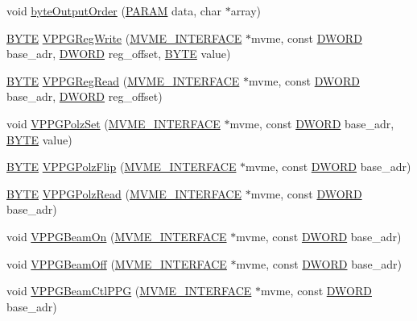 \begin{DoxyCompactItemize}
\item 
void \hyperlink{vppg_8h_a75ca53aa4c6983bef5186a0138854857}{byteOutputOrder} (\hyperlink{structparameters}{PARAM} data, char $\ast$array)
\item 
\hyperlink{vt2_8h_a4ae1dab0fb4b072a66584546209e7d58}{BYTE} \hyperlink{vppg_8h_a4f6ab8a9fcc14540cbd36f5d9313e8e8}{VPPGRegWrite} (\hyperlink{structMVME__INTERFACE}{MVME\_\-INTERFACE} $\ast$mvme, const \hyperlink{vt2_8h_a798af1e30bc65f319c1a246cecf59e39}{DWORD} base\_\-adr, \hyperlink{vt2_8h_a798af1e30bc65f319c1a246cecf59e39}{DWORD} reg\_\-offset, \hyperlink{vt2_8h_a4ae1dab0fb4b072a66584546209e7d58}{BYTE} value)
\item 
\hyperlink{vt2_8h_a4ae1dab0fb4b072a66584546209e7d58}{BYTE} \hyperlink{vppg_8h_ab31234aa03b2821e9b5fc3be5a62d2fb}{VPPGRegRead} (\hyperlink{structMVME__INTERFACE}{MVME\_\-INTERFACE} $\ast$mvme, const \hyperlink{vt2_8h_a798af1e30bc65f319c1a246cecf59e39}{DWORD} base\_\-adr, \hyperlink{vt2_8h_a798af1e30bc65f319c1a246cecf59e39}{DWORD} reg\_\-offset)
\item 
void \hyperlink{vppg_8h_aba92a718f41a4d59f7ee3493fc703c42}{VPPGPolzSet} (\hyperlink{structMVME__INTERFACE}{MVME\_\-INTERFACE} $\ast$mvme, const \hyperlink{vt2_8h_a798af1e30bc65f319c1a246cecf59e39}{DWORD} base\_\-adr, \hyperlink{vt2_8h_a4ae1dab0fb4b072a66584546209e7d58}{BYTE} value)
\item 
\hyperlink{vt2_8h_a4ae1dab0fb4b072a66584546209e7d58}{BYTE} \hyperlink{vppg_8h_ae7f3d0874c56189b93a9abde9c337714}{VPPGPolzFlip} (\hyperlink{structMVME__INTERFACE}{MVME\_\-INTERFACE} $\ast$mvme, const \hyperlink{vt2_8h_a798af1e30bc65f319c1a246cecf59e39}{DWORD} base\_\-adr)
\item 
\hyperlink{vt2_8h_a4ae1dab0fb4b072a66584546209e7d58}{BYTE} \hyperlink{vppg_8h_a5250200ded85e3f2e65c941384379ed5}{VPPGPolzRead} (\hyperlink{structMVME__INTERFACE}{MVME\_\-INTERFACE} $\ast$mvme, const \hyperlink{vt2_8h_a798af1e30bc65f319c1a246cecf59e39}{DWORD} base\_\-adr)
\item 
void \hyperlink{vppg_8h_acbbb2e3ab52f1662cfd8fba628ebf1ca}{VPPGBeamOn} (\hyperlink{structMVME__INTERFACE}{MVME\_\-INTERFACE} $\ast$mvme, const \hyperlink{vt2_8h_a798af1e30bc65f319c1a246cecf59e39}{DWORD} base\_\-adr)
\item 
void \hyperlink{vppg_8h_a2cdff7a4d21921939992eba5946ea4ad}{VPPGBeamOff} (\hyperlink{structMVME__INTERFACE}{MVME\_\-INTERFACE} $\ast$mvme, const \hyperlink{vt2_8h_a798af1e30bc65f319c1a246cecf59e39}{DWORD} base\_\-adr)
\item 
void \hyperlink{vppg_8h_a243cf578335a36f73dafcacfc457aaaa}{VPPGBeamCtlPPG} (\hyperlink{structMVME__INTERFACE}{MVME\_\-INTERFACE} $\ast$mvme, const \hyperlink{vt2_8h_a798af1e30bc65f319c1a246cecf59e39}{DWORD} base\_\-adr)

\end{DoxyCompactItemize}
